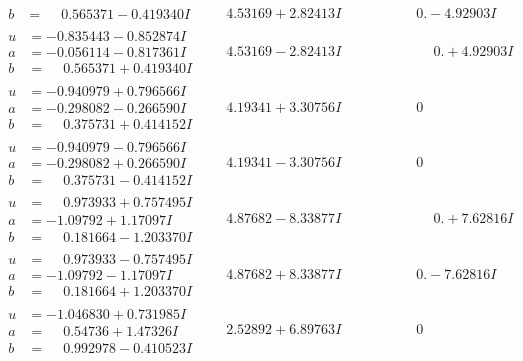 \documentclass[1p]{elsarticle_modified}
\theoremstyle{definition}
\begin{document}
$$\begin{array}{c|c|c}
\begin{aligned}
b &= \phantom{-}0.565371 - 0.419340 I\end{aligned}
 & \phantom{-}4.53169 + 2.82413 I & \phantom{-0.000000 } 0. - 4.92903 I \\ \hline\begin{aligned}
u &= -0.835443 - 0.852874 I \\
a &= -0.056114 - 0.817361 I \\
b &= \phantom{-}0.565371 + 0.419340 I\end{aligned}
 & \phantom{-}4.53169 - 2.82413 I & \phantom{-0.000000 -}0. + 4.92903 I \\ \hline\begin{aligned}
u &= -0.940979 + 0.796566 I \\
a &= -0.298082 - 0.266590 I \\
b &= \phantom{-}0.375731 + 0.414152 I\end{aligned}
 & \phantom{-}4.19341 + 3.30756 I & \phantom{-0.000000 } 0 \\ \hline\begin{aligned}
u &= -0.940979 - 0.796566 I \\
a &= -0.298082 + 0.266590 I \\
b &= \phantom{-}0.375731 - 0.414152 I\end{aligned}
 & \phantom{-}4.19341 - 3.30756 I & \phantom{-0.000000 } 0 \\ \hline\begin{aligned}
u &= \phantom{-}0.973933 + 0.757495 I \\
a &= -1.09792 + 1.17097 I \\
b &= \phantom{-}0.181664 - 1.203370 I\end{aligned}
 & \phantom{-}4.87682 - 8.33877 I & \phantom{-0.000000 -}0. + 7.62816 I \\ \hline\begin{aligned}
u &= \phantom{-}0.973933 - 0.757495 I \\
a &= -1.09792 - 1.17097 I \\
b &= \phantom{-}0.181664 + 1.203370 I\end{aligned}
 & \phantom{-}4.87682 + 8.33877 I & \phantom{-0.000000 } 0. - 7.62816 I \\ \hline\begin{aligned}
u &= -1.046830 + 0.731985 I \\
a &= \phantom{-}0.54736 + 1.47326 I \\
b &= \phantom{-}0.992978 - 0.410523 I\end{aligned}
 & \phantom{-}2.52892 + 6.89763 I & \phantom{-0.000000 } 0 \\ \hline\begin{aligned}

\end{aligned}
\end{array}$$
\end{document}
